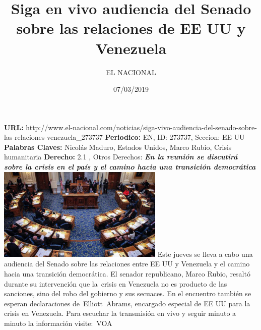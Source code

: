 \documentclass{article}%
\title{\textbf{Siga en vivo audiencia del Senado sobre las relaciones de EE UU y Venezuela}}%
\author{EL NACIONAL}%
\date{07/03/2019}%
\begin{document}
%
\normalsize%
\maketitle%
\textbf{URL: }%
http://www.el{-}nacional.com/noticias/siga{-}vivo{-}audiencia{-}del{-}senado{-}sobre{-}las{-}relaciones{-}venezuela\_273737\newline%
%
\textbf{Periodico: }%
EN, %
ID: %
273737, %
Seccion: %
EE UU\newline%
%
\textbf{Palabras Claves: }%
Nicolás Maduro, Estados Unidos, Marco Rubio, Crisis humanitaria\newline%
%
\textbf{Derecho: }%
2.1%
, Otros Derechos: %
\newline%
%
\textbf{\textit{En la reunión se discutirá sobre la crisis en el país y el camino hacia una transición democrática}}%
\newline%
\newline%
%
\includegraphics[width=300px]{EN_273737.jpg}%
\newline%
%
Este jueves se lleva a cabo una audiencia del Senado sobre las relaciones entre EE UU y Venezuela y el camino hacia una transición democrática.%
\newline%
%
El senador republicano, Marco Rubio, resaltó durante su intervención que la~crisis en Venezuela no es producto de las sanciones, sino del robo del gobierno y sus secuaces.%
\newline%
%
En el encuentro también se esperan declaraciones de~Elliott~Abrams, encargado especial de EE UU para la crisis en Venezuela.%
\newline%
%
Para escuchar la transmisión en vivo y seguir minuto a minuto la información visite:~VOA%
\newline%
%
\end{document}
